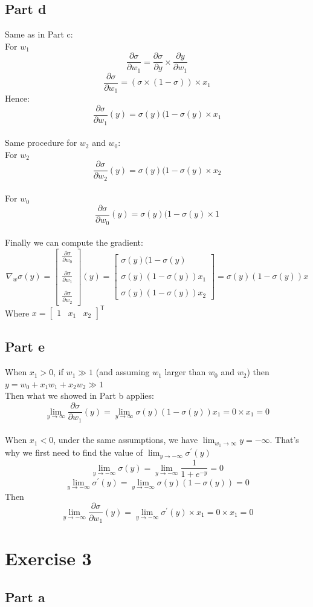 \documentclass[a4paper, 10pt]{article}
\begin{document}
\subsection{Part d}
Same as in Part c:
\\
For $w_1$
$$
\frac{\partial\sigma}{\partial w_1} = \frac{\partial\sigma}{\partial y} \times \frac{\partial y}{\partial w_1}
$$
$$
\frac{\partial\sigma}{\partial w_1} = \left(\sigma \times (1 - \sigma)\right) \times x_1
$$
Hence:
$$
\frac{\partial\sigma}{\partial w_1}(y) = \sigma(y) (1-\sigma(y) \times x_1
$$
\\
Same procedure for $w_2$ and $w_0$:\\
For $w_2$
$$
\frac{\partial\sigma}{\partial w_2}(y) = \sigma(y) (1-\sigma(y) \times x_2
$$
\\
For $w_0$
$$
\frac{\partial\sigma}{\partial w_0}(y) = \sigma(y) (1-\sigma(y) \times 1
$$
\\
Finally we can compute the gradient:
$$
\nabla_w\sigma(y) = \begin{bmatrix}
                        \frac{\partial\sigma}{\partial w_0}\\\\
                        \frac{\partial\sigma}{\partial w_1}\\\\
                        \frac{\partial\sigma}{\partial w_2}
                    \end{bmatrix}(y) = 
                    \begin{bmatrix}
                        \sigma(y) (1-\sigma(y)\\\\
                        \sigma(y) (1-\sigma(y)) x_1\\\\
                        \sigma(y) (1-\sigma(y)) x_2
                    \end{bmatrix} =
                    \sigma(y)(1-\sigma(y))x
$$
Where $x =  \begin{bmatrix}
            1 & x_1 & x_2
            \end{bmatrix}^\mathsf{T}$

\subsection{Part e}
When $x_1 > 0$, if $w_1 \gg 1$ (and assuming $w_1$ larger than $w_0$ and $w_2$) then $y = w_0 + x_1w_1 + x_2w_2 \gg 1$
\\
Then what we showed in Part b applies:
$$
\lim_{y\to\infty} \frac{\partial\sigma}{\partial w_1}(y) = \lim_{y\to\infty} \sigma(y) (1-\sigma(y)) x_1 = 0 \times x_1 = 0
$$
\\
When $x_1 < 0$, under the same assumptions, we have $\lim_{w_1\to\infty}y = -\infty$. That's why we first need to find the value of $\lim_{y\to -\infty}\sigma^\prime(y)$
$$
\lim_{y\to -\infty}\sigma(y) = \lim_{y\to -\infty} \frac{1}{1+e^{-y}} = 0
$$
$$
\lim_{y\to -\infty}\sigma^\prime(y) = \lim_{y\to -\infty} \sigma(y)(1-\sigma(y))=0
$$
Then
$$
\lim_{y\to -\infty}\frac{\partial\sigma}{\partial w_1}(y) = \lim_{y\to -\infty} \sigma^\prime(y) \times x_1 = 0 \times x_1 = 0
$$

\section{Exercise 3}
\subsection{Part a}
\end{document}
